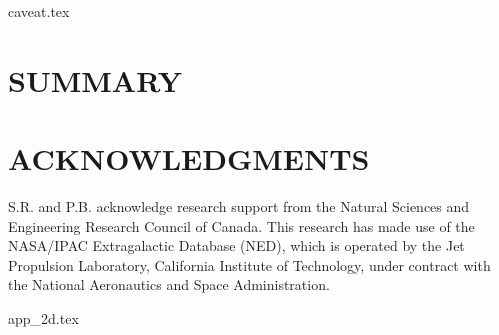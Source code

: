 \documentclass[useAMS,usenatbib]{mn2e}
\begin{document}
{caveat.tex}

\section{SUMMARY}

\section*{ACKNOWLEDGMENTS}
S.R. and P.B. acknowledge research support from the Natural Sciences and Engineering Research Council of Canada. This research has made use of the NASA/IPAC Extragalactic Database (NED), which is operated by the Jet Propulsion Laboratory, California Institute of Technology, under contract with the National Aeronautics and Space Administration.


{app_2d.tex}
\end{document}
